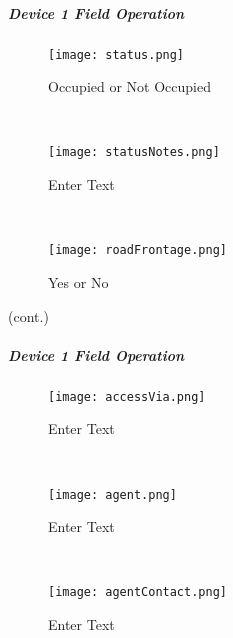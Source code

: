 \clearpage
\subparagraph*{Device 1 Field Operation}
\begin{wrapfigure}{r}{0.4\textwidth}
\centering
    \texttt{[image: status.png]}
\caption {Occupied or Not Occupied}
\vspace{.05in}

\HRule \\[.4cm] %
\vspace{.05in}

    \texttt{[image: statusNotes.png]}
\caption{Enter Text}
\vspace{.05in}

\HRule \\[.4cm] %
\vspace{.05in}

    \texttt{[image: roadFrontage.png]}
\caption{Yes or No}
\end{wrapfigure}

(cont.)
\vspace{1in}


\vspace{2.5in}

\vspace{2.5in}

\clearpage
\subparagraph*{Device 1 Field Operation}
\begin{wrapfigure}{r}{0.4\textwidth}
\centering
    \texttt{[image: accessVia.png]}
\caption {Enter Text}
\vspace{.05in}

\HRule \\[.4cm] %
\vspace{.05in}

    \texttt{[image: agent.png]}
\caption{Enter Text}
\vspace{.05in}

\HRule \\[.4cm] %
\vspace{.05in}

    \texttt{[image: agentContact.png]}
\caption{Enter Text}
\end{wrapfigure}


